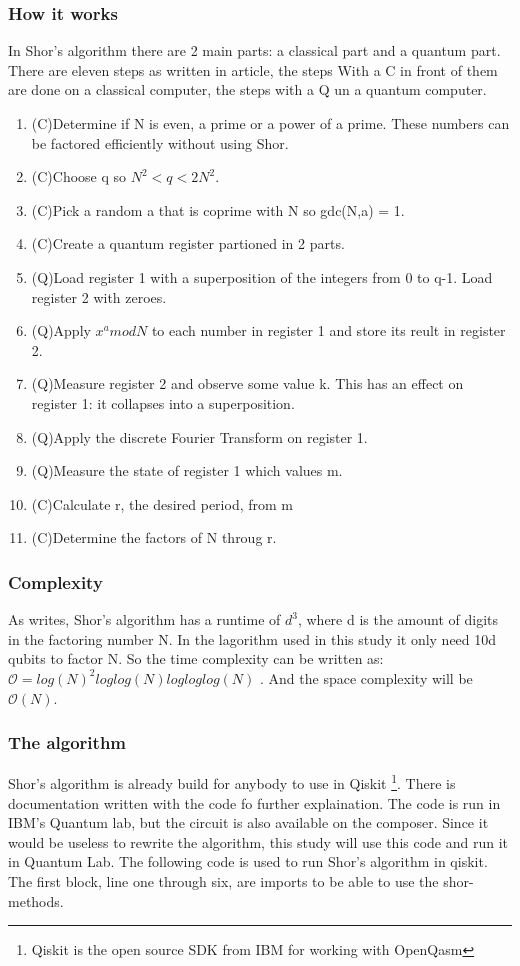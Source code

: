 \subsubsection{How it works}
In Shor's algorithm there are 2 main parts: a classical part and a quantum part.
There are eleven steps as written in \textcite{shor_step} article, the steps With a C in front of them are done on a classical computer, the steps with a Q un a quantum computer.
\begin{enumerate}
    \item (C)Determine if N is even, a prime or a power of a prime. These numbers can be factored efficiently without using Shor. 
    \item (C)Choose q so $N^2<q<2N^2$.
    \item (C)Pick a random a that is coprime with N so gdc(N,a) = 1.
    \item (C)Create a quantum register partioned in 2 parts.
    \item (Q)Load register 1 with a superposition of the integers from 0 to q-1. Load register 2 with zeroes.
    \item (Q)Apply $x^a mod N$ to each number in register 1 and store its reult in register 2.
    \item (Q)Measure register 2 and observe some value k. This has an effect on register 1: it collapses into a superposition.
    \item (Q)Apply the discrete Fourier Transform on register 1.
    \item (Q)Measure the state of register 1 which values m.
    \item (C)Calculate r, the desired period, from m
    \item (C)Determine the factors of N throug r.

\end{enumerate}
\subsubsection{Complexity}
As \textcite{shor_algo} writes, Shor's algorithm has a runtime of $d^3$, where d is the amount of digits in the factoring number N. In the lagorithm used in this study it only need 10d qubits to factor N.
So the time complexity can be written as: $\mathcal{O} = log(N)^2log log(N) log log log(N)$ \autocite{shor_comp}. And the space complexity will be $\mathcal{O}(N)$.
\subsubsection{The algorithm}
Shor's algorithm is already build for anybody to use in Qiskit \footnote{Qiskit is the open source SDK from IBM for working with OpenQasm}. There is documentation written with the code fo further explaination.
The code is run in IBM's Quantum lab, but the circuit is also available on the composer. Since it would be useless to rewrite the algorithm, this study will use this code and run it in Quantum Lab.
The following code is used to run Shor's algorithm in qiskit. The first block, line one through six, are imports to be able to use the shor-methods.


